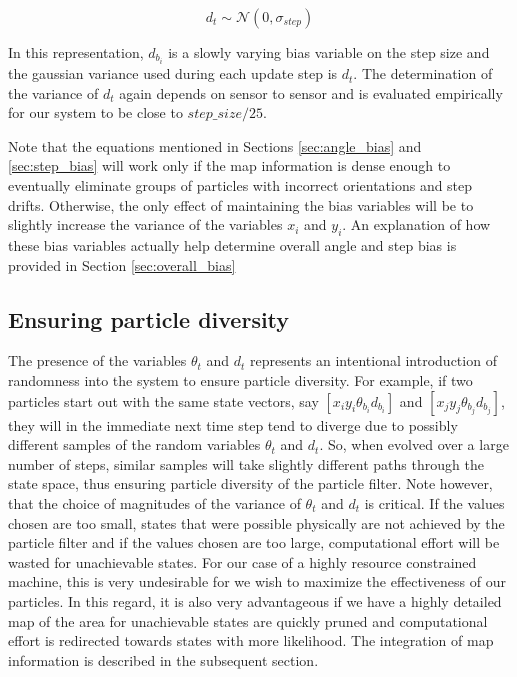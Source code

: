 \documentclass[10pt,journal,letterpaper,compsoc]{IEEEtran}
\begin{document}
\begin{equation}
d_{t} \sim \mathcal{N}(0, \sigma_{step})
\end{equation}

In this representation, $d_{b_i}$ is a slowly varying bias variable on the step
size and the gaussian variance used during each update step is $d_t$. The 
determination of the variance of $d_t$ again depends on sensor to sensor and 
is evaluated empirically for our system to be close to $step\_size/25$.

Note that the equations mentioned in Sections \ref{sec:angle_bias} and
\ref{sec:step_bias} will work only if the map information is dense enough to
eventually eliminate groups of particles with incorrect orientations and 
step drifts. Otherwise, the only effect of maintaining the bias variables will 
be to slightly increase the variance of the variables $x_i$ and $y_i$.
An explanation of how these bias variables actually help determine overall
angle and step bias is provided in Section \ref{sec:overall_bias}

\subsection{Ensuring particle diversity}

The presence of the variables $\theta_{t}$ and $d_t$ represents an 
intentional introduction of randomness into the system to ensure 
particle diversity. For example, if two particles start out with the same
state vectors, say 
$ [ x_i y_i \theta_{b_i} d_{b_i} ] $ and 
$ [ x_j y_j \theta_{b_j} d_{b_j} ] $, they will in the immediate 
next time step tend to diverge due to possibly different samples of the 
random variables $\theta_{t}$ and $d_t$. So, 
when evolved over a large number of steps, similar samples will take 
slightly different paths through the state space, thus ensuring particle 
diversity of the particle filter. Note however, that the choice of 
magnitudes of the variance of $\theta_t$ and $d_t$ is critical. If the 
values chosen are too small, states that were possible physically are 
not achieved by the particle filter and if the values chosen are too large,
computational effort will be wasted for unachievable states. For our case 
of a highly resource constrained machine, this is very undesirable for we
wish to maximize the effectiveness of our particles. In this regard, it is 
also very advantageous if we have a highly detailed map of the area for 
unachievable states are quickly pruned and computational effort is 
redirected towards states with more likelihood. The integration of 
map information is described in the subsequent section.
\end{document}
